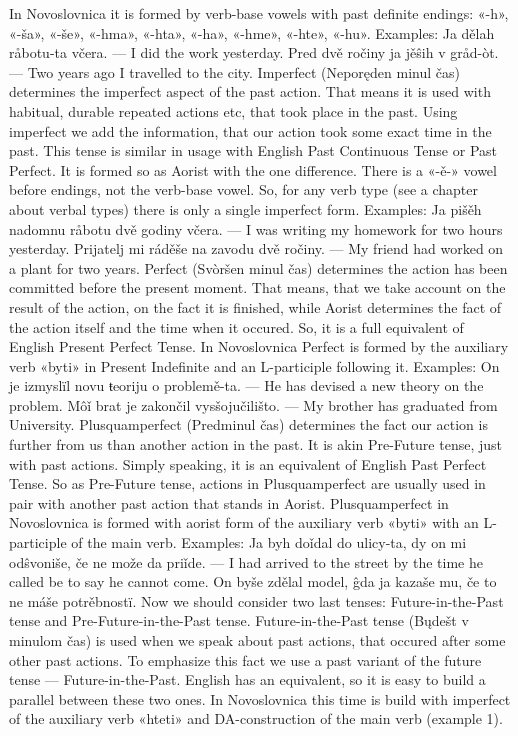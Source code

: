 In Novoslovnica it is formed by verb-base vowels with past definite endings: «-h», «-ša», «-še», «-hma», «-hta», «-ha», «-hme», «-hte», «-hu».
Examples:
Ja dělah råbotu-ta včera. — I did the work yesterday.
Pred dvě ročiny ja jěŝih v gråd-òt. — Two years ago I travelled to the city.
Imperfect (Neporęden minul čas) determines the imperfect aspect of the past action. That means it is used with habitual, durable repeated actions etc, that took place in the past. Using imperfect we add the information, that our action took some exact time in the past. This tense is similar in usage with English Past Continuous Tense or Past Perfect.
It is formed so as Aorist with the one difference. There is a «-ě-» vowel before endings, not the verb-base vowel. So, for any verb type (see a chapter about verbal types) there is only a single imperfect form.
Examples:
Ja pišěh nadomnu råbotu dvě godiny včera. — I was writing my homework for two hours yesterday.
Prijatelj mi ráděše na zavodu dvě ročiny. — My friend had worked on a plant for two years.
Perfect (Svòršen minul čas) determines the action has been committed before the present moment. That means, that we take account on the result of the action, on the fact it is finished, while Aorist determines the fact of the action itself and the time when it occured. So, it is a full equivalent of English Present Perfect Tense.
In Novoslovnica Perfect is formed by the auxiliary verb «byti» in Present Indefinite and an L-participle following it.
Examples:
On je izmyslïl novu ŧeoriju o problemě-ta. — He has devised a new theory on the problem.
Môǐ brat je zakončil vysšojučilišto. — My brother has graduated from University.
Plusquamperfect (Predminul čas) determines the fact our action is further from us than another action in the past. It is akin Pre-Future tense, just with past actions. Simply speaking, it is an equivalent of English Past Perfect Tense. So as Pre-Future tense, actions in Plusquamperfect are usually used in pair with another past action that stands in Aorist.
Plusquamperfect in Novoslovnica is formed with aorist form of the auxiliary verb «byti» with an L-participle of the main verb.
Examples:
Ja byh doǐdal do ulicy-ta, dy on mi odŝvoniše, če ne može da priǐde. — I had arrived to the street by the time he called be to say he cannot come.
On byše zdělal model, ĝda ja kazaše mu, če to ne máše potrěbnostï.
Now we should consider two last tenses: Future-in-the-Past tense and Pre-Future-in-the-Past tense.
Future-in-the-Past tense (Bųdešt v minulom čas) is used when we speak about past actions, that occured after some other past actions. To emphasize this fact we use a past variant of the future tense — Future-in-the-Past. English has an equivalent, so it is easy to build a parallel between these two ones. In Novoslovnica this time is build with imperfect of the auxiliary verb «hteti» and DA-construction of the main verb (example 1).
